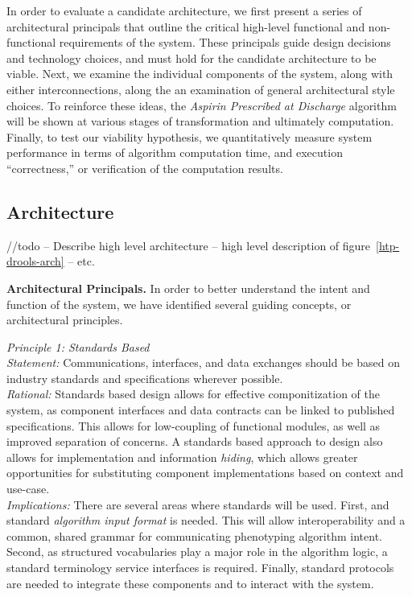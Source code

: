 \documentclass{amia}
\begin{document}
In order to evaluate a candidate architecture, we first present a series of architectural principals that outline the critical high-level functional and non-functional requirements of the system. These principals guide design decisions and technology choices, and must hold for the candidate architecture to be viable. Next, we examine the individual components of the system, along with either interconnections, along the an examination of general architectural style choices. To reinforce these ideas, the \textit{Aspirin Prescribed at Discharge} algorithm will be shown at various stages of transformation and ultimately computation. Finally, to test our viability hypothesis, we quantitatively measure system performance in terms of algorithm computation time, and execution ``correctness,'' or verification of the computation results.

\subsection*{Architecture}
//todo -- Describe high level architecture -- high level description of figure~\ref{htp-drools-arch} -- etc.

\textbf{Architectural Principals.}
In order to better understand the intent and function of the system, we have identified several guiding concepts, or architectural principles\cite{garlan1993introduction}.

\textit{Principle 1: Standards Based}\\
\textit{Statement:} Communications, interfaces, and data exchanges should be based on industry standards and specifications wherever possible.\\
\textit{Rational:} Standards based design allows for effective componitization of the system, as component interfaces and data contracts can be linked to published specifications. This allows for low-coupling of functional modules, as well as improved separation of concerns. A standards based approach to design also allows for implementation and information \textit{hiding}\cite{sullivan2001structure}, which allows greater opportunities for substituting component implementations based on context and use-case.\\
\textit{Implications:} There are several areas where standards will be used. First, and standard \textit{algorithm input format} is needed. This will allow interoperability and a common, shared grammar for communicating phenotyping algorithm intent. Second, as structured vocabularies play a major role in the algorithm logic, a standard terminology service interfaces is required. Finally, standard protocols are needed to integrate these components and to interact with the system.
\end{document}
